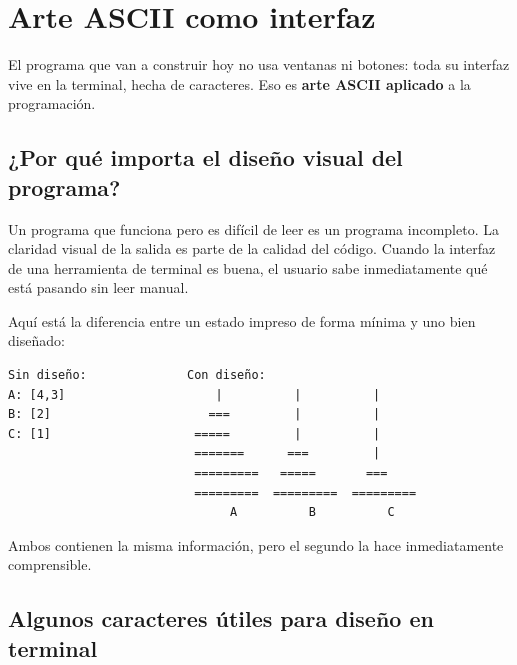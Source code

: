 \documentclass[12pt, oneside]{article}
\begin{document}
\section{Arte ASCII como interfaz}

El programa que van a construir hoy no usa ventanas ni botones:
toda su interfaz vive en la terminal, hecha de caracteres.
Eso es \textbf{arte ASCII aplicado} a la programación.

\subsection{¿Por qué importa el diseño visual del programa?}

Un programa que funciona pero es difícil de leer es un programa incompleto.
La claridad visual de la salida es parte de la calidad del código.
Cuando la interfaz de una herramienta de terminal es buena, el usuario
sabe inmediatamente qué está pasando sin leer manual.

Aquí está la diferencia entre un estado impreso de forma mínima y
uno bien diseñado:

\begin{verbatim}
Sin diseño:              Con diseño:
A: [4,3]                     |          |          |
B: [2]                      ===         |          |
C: [1]                    =====         |          |
                          =======      ===         |
                          =========   =====       ===
                          =========  =========  =========
                               A          B          C
\end{verbatim}

Ambos contienen la misma información, pero el segundo la hace
inmediatamente comprensible.

\subsection{Algunos caracteres útiles para diseño en terminal}
\end{document}
